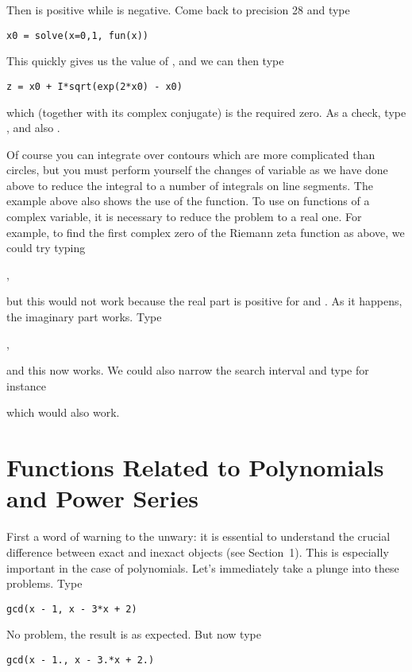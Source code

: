 Then  is positive while  is negative. Come back to
precision 28 and type

\centerline{\tt x0 = solve(x=0,1, fun(x))}

This quickly gives us the value of , and we can then type

\centerline{\tt z = x0 + I*sqrt(exp(2*x0) - x0)}

\noindent which (together with its complex conjugate) is the required zero.
As a check, type , and also .

Of course you can integrate over contours which are more complicated than
circles, but you must perform yourself the changes of variable as we have
done above to reduce the integral to a number of integrals on line segments.
\smallskip
%
The example above also shows the use of the  function. To use
 on functions of a complex variable, it is necessary to reduce the
problem to a real one. For example, to find the first complex zero of the
Riemann zeta function as above, we could try typing

,

\noindent but this would not work because the real part is positive for
 and . As it happens, the imaginary part works. Type

,

\noindent and this now works. We could also narrow the search interval and
type for instance


\noindent which would also work.

\section{Functions Related to Polynomials and Power Series}

First a word of warning to the unwary: it is essential to understand the
crucial difference between exact and inexact objects (see Section~1). This
is especially important in the case of polynomials. Let's immediately take
a plunge into these problems. Type

\centerline{\tt gcd(x - 1, x - 3*x + 2)}

 No problem, the result is  as expected. But now type

\centerline{\tt gcd(x - 1., x - 3.*x + 2.)}

